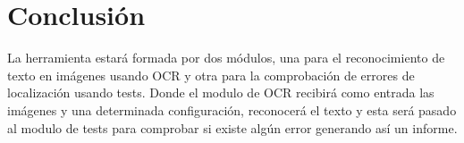 	
\section{Conclusión}
La herramienta estará formada por dos módulos, una para el reconocimiento de texto en imágenes usando OCR y otra para la comprobación de errores de localización usando tests. Donde el modulo de OCR recibirá como entrada las imágenes y una determinada configuración, reconocerá el texto y esta será pasado al modulo de tests para comprobar si existe algún error generando así un informe.

 

